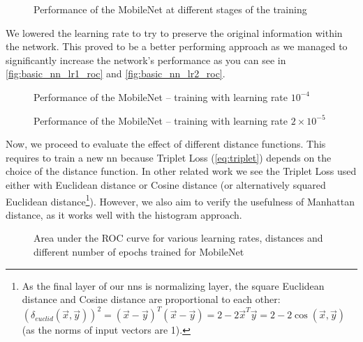 \begin{figure}
    \centering
    \def\svgwidth{\columnwidth}
    
    \caption{Performance of the MobileNet at different stages of the training}
    \label{fig:basic_nn_overfit_roc}
\end{figure}

We lowered the learning rate to try to preserve the original information within the network. This proved to be a better performing approach as we managed to significantly increase the network's performance as you can see in \autoref{fig:basic_nn_lr1_roc} and \autoref{fig:basic_nn_lr2_roc}.

\begin{figure}
    \centering
    \def\svgwidth{\columnwidth}
    
    \caption{Performance of the MobileNet -- training with learning rate $10^{-4}$}
    \label{fig:basic_nn_lr1_roc}
\end{figure}

\begin{figure}
    \centering
    \def\svgwidth{\columnwidth}
    
    \caption{Performance of the MobileNet -- training with learning rate $2 \times 10^{-5}$}
    \label{fig:basic_nn_lr2_roc}
\end{figure}

Now, we proceed to evaluate the effect of different distance functions. This requires to train a new \gls{nn} because Triplet Loss (\autoref{eq:triplet}) depends on the choice of the distance function. In other related work we see the Triplet Loss used either with Euclidean distance or Cosine distance (or alternatively squared Euclidean distance\footnote{As the final layer of our \glspl{nn} is normalizing layer, the square Euclidean distance and Cosine distance are proportional to each other: $\left(\delta_{euclid}(\vec{x}, \vec{y})\right)^2 = (\vec{x} - \vec{y})^T(\vec{x} - \vec{y}) = 2 - 2\vec{x}^T\vec{y} = 2 - 2 \cos(\vec{x}, \vec{y})$ (as the norms of input vectors are 1).}). However, we also aim to verify the usefulness of Manhattan distance, as it works well with the histogram approach.

\begin{figure}
    \centering
    \large
    
    \def\svgwidth{\columnwidth}
    \scalebox{0.75}{}
    \vspace{1cm}

    
    \def\svgwidth{\columnwidth}
    \scalebox{0.75}{}
    \vspace{1cm}
    
    \def\svgwidth{\columnwidth}
    \scalebox{0.75}{
    }
    \caption{Area under the ROC curve for various learning rates, distances and different number of epochs trained for MobileNet}
    \label{fig:lr_heatmap}
\end{figure}

